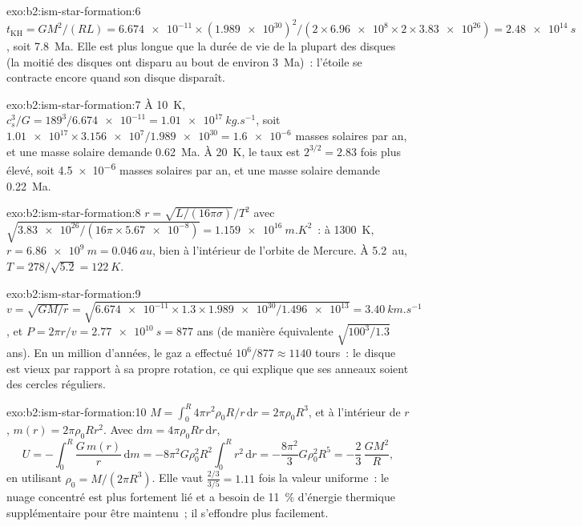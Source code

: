 \begin{solution}{exo:b2:ism-star-formation:6}
$t_{\mathrm{KH}} = GM^2/(RL) = \num{6.674e-11}\times(\num{1.989e30})^2/(2\times
\num{6.96e8}\times2\times\num{3.83e26}) = \qty{2.48e14}{s}$, soit
\qty{7.8}{Ma}. Elle est plus longue que la durée de vie de la plupart des disques (la moitié des disques ont disparu au bout de
environ \qty{3}{Ma})~: l'étoile se contracte encore quand son disque disparaît.
\end{solution}

\begin{solution}{exo:b2:ism-star-formation:7}
À \qty{10}{K}, $c_s^3/G = 189^3/\num{6.674e-11} = \qty{1.01e17}{kg.s^{-1}}$, soit
$\num{1.01e17}\times\num{3.156e7}/\num{1.989e30} = \num{1.6e-6}$ masses solaires par
an, et une masse solaire demande \qty{0.62}{Ma}. À \qty{20}{K}, le taux est
$2^{3/2} = 2.83$ fois plus élevé, soit \num{4.5e-6} masses solaires par an, et une
masse solaire demande \qty{0.22}{Ma}.
\end{solution}

\begin{solution}{exo:b2:ism-star-formation:8}
$r = \sqrt{L/(16\pi\sigma)}/T^2$ avec $\sqrt{\num{3.83e26}/(16\pi\times\num{5.67e-8})}
= \qty{1.159e16}{m.K^2}$~: à \qty{1300}{K}, $r = \qty{6.86e9}{m} = \qty{0.046}{au}$,
bien à l'intérieur de l'orbite de Mercure. À \qty{5.2}{au}, $T = 278/\sqrt{5.2} = \qty{122}{K}$.
\end{solution}

\begin{solution}{exo:b2:ism-star-formation:9}
$v = \sqrt{GM/r} = \sqrt{\num{6.674e-11}\times1.3\times\num{1.989e30}/\num{1.496e13}}
= \qty{3.40}{km.s^{-1}}$, et $P = 2\pi r/v = \qty{2.77e10}{s} = 877$ ans
(de manière équivalente $\sqrt{100^3/1.3}$ ans). En un million d'années, le gaz a effectué
$10^6/877 \approx \num{1140}$ tours~: le disque est vieux par rapport à sa propre rotation,
ce qui explique que ses anneaux soient des cercles réguliers.
\end{solution}

\begin{solution}{exo:b2:ism-star-formation:10}
$M = \int_0^R 4\pi r^2\rho_0R/r\,\mathrm dr = 2\pi\rho_0R^3$, et à l'intérieur de $r$,
$m(r) = 2\pi\rho_0Rr^2$. Avec $\mathrm dm = 4\pi\rho_0Rr\,\mathrm dr$,
\[
  U = -\int_0^R \frac{G\,m(r)}{r}\,\mathrm dm
    = -8\pi^2G\rho_0^2R^2\int_0^R r^2\,\mathrm dr = -\frac{8\pi^2}{3}G\rho_0^2R^5
    = -\frac23\,\frac{GM^2}{R},
\]
en utilisant $\rho_0 = M/(2\pi R^3)$. Elle vaut $\tfrac{2/3}{3/5} = 1.11$ fois la valeur uniforme~:
le nuage concentré est plus fortement lié et a besoin de \qty{11}{\percent} d'énergie thermique
supplémentaire pour être maintenu~; il s'effondre plus facilement.
\end{solution}

